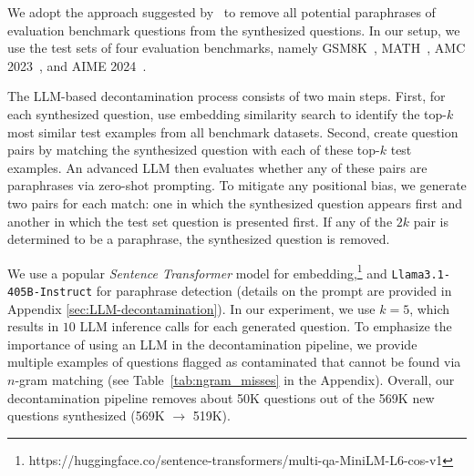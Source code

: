 We adopt the approach suggested by~\citet{yang2023rethinkingbenchmarkcontaminationlanguage} to 
remove all potential paraphrases of evaluation benchmark questions from the synthesized questions. 
In our setup, we use the test sets of four evaluation benchmarks, namely GSM8K~\citep{cobbe2021gsm8k}, MATH~\citep{hendrycks2021measuringmathematicalproblemsolving}, AMC 2023~\citep{AMC23}, and AIME 2024~\citep{aime24}. 

The LLM-based decontamination process consists of two main steps. 
First, for each synthesized question, use embedding similarity search to identify the top-$k$ most similar test examples from all benchmark datasets. 
Second, create question pairs by matching the synthesized question with each of these top-$k$ test examples. 
An advanced LLM then evaluates whether any of these pairs are paraphrases via zero-shot prompting.  
To mitigate any positional bias, we generate two pairs for each match: one in which the synthesized question appears first and another in which the test set question is presented first. 
If any of the $2k$ pair is determined to be a paraphrase, the synthesized question is removed.

We use a popular \emph{Sentence Transformer} model for embedding,\footnote{https://huggingface.co/sentence-transformers/multi-qa-MiniLM-L6-cos-v1} and \texttt{Llama3.1-405B-Instruct} for paraphrase detection (details on the prompt are provided in Appendix  \ref{sec:LLM-decontamination}). 
In our experiment, we use $k = 5$, which results in $10$ LLM inference calls for each generated question. 
To emphasize the importance of using an LLM in the decontamination pipeline, we provide multiple examples of questions flagged as contaminated that cannot be found via $n$-gram matching (see Table~\ref{tab:ngram_misses} in the Appendix). 
Overall, our decontamination pipeline removes about 50K questions out of the 569K new questions synthesized (569K $\longrightarrow$ 519K). 





